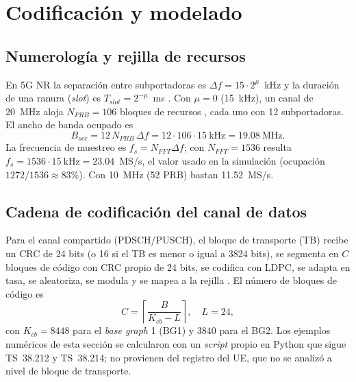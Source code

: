 \documentclass[conference]{IEEEtran}
\begin{document}
\section{Codificación y modelado}
\label{sec:cod}

\subsection{Numerología y rejilla de recursos}
En 5G NR la separación entre subportadoras es $\Delta f = 15\cdot 2^{\mu}$~kHz y la duración de una ranura (\textit{slot}) es $T_{slot}=2^{-\mu}$~ms \cite{ts38211}. Con $\mu=0$ (15~kHz), un canal de 20~MHz aloja $N_{PRB}=106$ bloques de recursos \cite{ts38101}, cada uno con 12 subportadoras. El ancho de banda ocupado es
\begin{equation}
B_{occ}=12\,N_{PRB}\,\Delta f = 12\cdot106\cdot15~\mathrm{kHz}=19.08~\mathrm{MHz}.
\end{equation}
La frecuencia de muestreo es $f_s=N_{FFT}\Delta f$; con $N_{FFT}=1536$ resulta $f_s=1536\cdot15~\mathrm{kHz}=23.04$~MS/s, el valor usado en la simulación (ocupación $1272/1536\approx83\%$). Con 10~MHz (52 PRB) bastan 11.52~MS/s.

\subsection{Cadena de codificación del canal de datos}
Para el canal compartido (PDSCH/PUSCH), el bloque de transporte (TB) recibe un CRC de 24 bits (o 16 si el TB es menor o igual a 3824 bits), se segmenta en $C$ bloques de código con CRC propio de 24 bits, se codifica con LDPC, se adapta en tasa, se aleatoriza, se modula y se mapea a la rejilla \cite{ts38212}. El número de bloques de código es
\begin{equation}
C=\left\lceil \frac{B}{K_{cb}-L}\right\rceil,\quad L=24,
\end{equation}
con $K_{cb}=8448$ para el \textit{base graph} 1 (BG1) y $3840$ para el BG2. Los ejemplos numéricos de esta sección se calcularon con un \textit{script} propio en Python que sigue TS~38.212 y TS~38.214; no provienen del registro del UE, que no se analizó a nivel de bloque de transporte.
\end{document}
